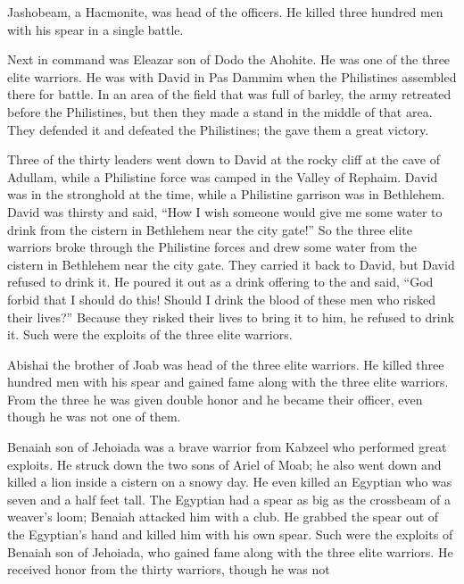 {\par }{\PP Jashobeam,
a Hacmonite,
was head
of the officers.
He killed
three
hundred
men with
his spear
in a single battle.
\par }{\PP {}Next in command
was Eleazar
son
of Dodo
the Ahohite.
He was one of the three
elite warriors.
He
was
with
David
in Pas Dammim
when the Philistines
assembled
there
for battle.
In an area
of the field
that was full
of barley,
the army
retreated
before
the Philistines,
but then they made a stand
in the middle
of that area.
They defended
it and defeated
the
Philistines;
the {}
gave
them a great
victory.
\par }{\PP {}Three
of the thirty
leaders
went down
to
David
at the rocky
cliff at the cave
of Adullam,
while a Philistine
force was camped
in the Valley
of Rephaim.
David
was in the stronghold
at the time,
while a Philistine
garrison
was in Bethlehem.
David
was thirsty
and said,
“How I wish
someone would
give me some water
to drink
from the cistern
in Bethlehem
near the city gate!”
So the three
elite warriors broke through
the Philistine
forces
and drew
some water
from the cistern
in Bethlehem
near the city gate.
They carried
it back
to
David,
but David
refused
to drink
it. He poured
it out
as a drink offering to the
{}
and said,
“God
forbid
that I should do
this! Should I drink
the blood
of these
men
who risked their lives?” Because
they risked their lives
to bring
it to him, he refused
to drink
it. Such were the exploits
of the three
elite warriors.
\par }{\PP {}Abishai
the brother
of Joab
was
head
of the three
elite
warriors. He
killed three
hundred
men with his spear
and gained
fame
along with the three elite warriors.
From
the three
he was given double
honor
and he became
their officer,
even
though he was not one of them.
\par }{\PP {}Benaiah
son
of Jehoiada
was a brave
warrior
from Kabzeel
who performed great exploits. He struck
down the two
sons of Ariel
of Moab;
he also went down
and killed
a lion
inside
a cistern
on a snowy
day.
He
even killed
an Egyptian
who was seven and a half feet
tall.
The Egyptian
had a spear
as big as the crossbeam
of a weaver’s
loom; Benaiah attacked
him with
a club.
He grabbed
the spear
out of the Egyptian’s
hand
and killed
him with his own spear.
Such
were the exploits
of Benaiah
son
of Jehoiada,
who gained fame
along with the three
elite warriors.
He received honor
from
the thirty
warriors, though he was not
}
